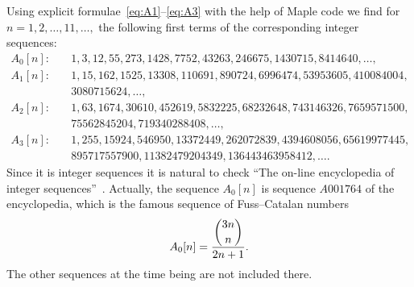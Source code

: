 \documentclass[pdftex]{sigma}
\numberwithin{equation}{section}
\begin{document}
\begin{Remark}\label{rem:sequences-Ak}
Using explicit formulae~\eqref{eq:A1}--\eqref{eq:A3} with the help of Maple code we find for $n=1,2,\ldots,11,\ldots,$
the following first terms of the corresponding integer sequences:
\begin{align*}
A_0[n]\colon\quad
&1,3,12,55,273,1428,7752,43263,246675,1430715,8414640,\ldots,\\
A_1[n]\colon\quad
&1,15,162,1525,13308,110691,890724,6996474,53953605,410084004,\\
&3080715624,\ldots,\\
A_2[n]\colon\quad
&1,63,1674,30610,452619,5832225,68232648,743146326,7659571500,\\
&75562845204,719340288408,\ldots,\\
A_3[n]\colon\quad
&1,255,15924,546950,13372449,262072839,4394608056,65619977445,\\
&895717557900,11382479204349,136443463958412,\ldots.
\end{align*}
Since it is integer sequences it is natural to check
``The on-line encyclopedia of integer sequences''~\cite{OEIS}.
Actually, the sequence $A_0[n]$ is sequence $A001764$ of the encyclopedia, which
is the famous sequence of Fuss--Catalan numbers
\begin{gather}\label{eq:Fuss-Catalan}
A_0[n]=\frac{\dbinom{3n}{n}}{2n+1}.
\end{gather}
The other sequences at the time being are not included there.
\end{Remark}
\end{document}
